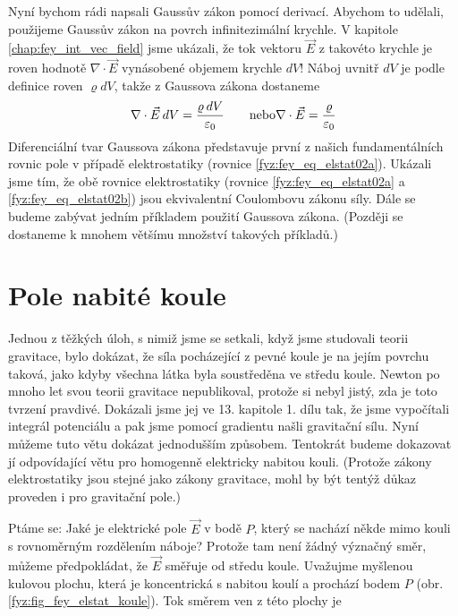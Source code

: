    Nyní bychom rádi napsali Gaussův zákon pomocí derivací. Abychom to udělali, použijeme Gaussův 
    zákon na povrch infinitezimální krychle. V kapitole \ref{chap:fey_int_vec_field} jsme ukázali, 
    že tok vektoru \(\vec{E}\) z takovéto krychle je roven hodnotě \(\nabla\cdot\vec{E}\) vynásobené 
    objemem krychle \(dV\)! Náboj uvnitř \(dV\) je podle definice roven \(\varrho dV\), takže z 
    Gaussova zákona dostaneme
    \begin{equation}\label{fyz:fey_eq_elstat38}
     \nabla\cdot\vec{E}\hspace{2pt}dV = \frac{\varrho\hspace{2pt}dV}{\varepsilon_0} \qquad 
     \text{nebo}
     \nabla\cdot\vec{E}       = \frac{\varrho}{\varepsilon_0}
    \end{equation}
    Diferenciální tvar Gaussova zákona představuje první z našich fundamentálních rovnic pole v 
    případě elektrostatiky (rovnice \ref{fyz:fey_eq_elstat02a}). Ukázali jsme tím, že obě rovnice 
    elektrostatiky (rovnice \ref{fyz:fey_eq_elstat02a} a \ref{fyz:fey_eq_elstat02b}) jsou 
    ekvivalentní Coulombovu zákonu síly. Dále se budeme zabývat jedním příkladem použití Gaussova 
    zákona. (Později se dostaneme k mnohem většímu množství takových příkladů.)
    
  \section{Pole nabité koule}\label{fyz:chap_fey_ponako}
    \cite[s.~77]{Feynman02} Jednou z těžkých úloh, s nimiž jsme se setkali, když jsme studovali 
    teorii gravitace, bylo dokázat, že síla pocházející z pevné koule je na jejím povrchu taková, 
    jako kdyby všechna látka byla soustředěna ve středu koule. Newton po mnoho let svou teorii 
    gravitace nepublikoval, protože si nebyl jistý, zda je toto tvrzení pravdivé. Dokázali jsme jej 
    ve 13. kapitole 1. dílu tak, že jsme vypočítali integrál potenciálu a pak jsme pomocí gradientu 
    našli gravitační sílu. Nyní můžeme tuto větu dokázat jednodušším způsobem. Tentokrát budeme 
    dokazovat jí odpovídající větu pro homogenně elektricky nabitou kouli. (Protože zákony 
    elektrostatiky jsou stejné jako zákony gravitace, mohl by být tentýž důkaz proveden i pro 
    gravitační pole.)
    
    Ptáme se: Jaké je elektrické pole \(\vec{E}\) v bodě \(P\), který se nachází někde mimo kouli s 
    rovnoměrným rozdělením náboje? Protože tam není žádný význačný směr, můžeme předpokládat, že 
    \(\vec{E}\) směřuje od středu koule. Uvažujme myšlenou kulovou plochu, která je koncentrická s 
    nabitou koulí a prochází bodem \(P\) (obr. \ref{fyz:fig_fey_elstat_koule}). Tok směrem ven z 
    této plochy je

